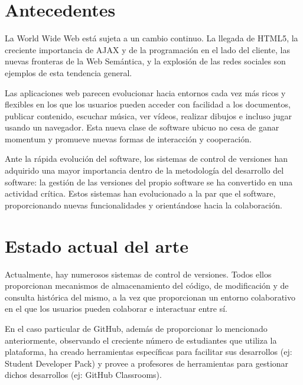 
\section{Antecedentes}
\label{1:sec:1}

La World Wide Web está sujeta a un cambio continuo. La llegada de HTML5, la creciente importancia
de AJAX y de la programación en el lado del cliente, las nuevas fronteras de la Web Semántica, y la
explosión de las redes sociales son ejemplos de esta tendencia general.
\bigskip

Las aplicaciones web parecen evolucionar hacia entornos cada vez más ricos y flexibles en los que
los usuarios pueden acceder con facilidad a los documentos, publicar contenido, escuchar música, ver
vídeos, realizar dibujos e incluso jugar usando un navegador. Esta nueva clase de software ubicuo no
cesa de ganar momentum y promueve nuevas formas de interacción y cooperación.
\bigskip

Ante la rápida evolución del software, los sistemas de control de versiones han adquirido una mayor importancia dentro de la metodología del desarrollo del software: la gestión de las versiones del propio software se ha convertido en una actividad crítica. Estos sistemas han evolucionado a la par que el software, proporcionando nuevas funcionalidades y orientándose hacia la colaboración.

\section{Estado actual del arte}
\label{1:sec:2}

Actualmente, hay numerosos sistemas de control de versiones. Todos ellos proporcionan mecanismos de almacenamiento del código, de modificación y de consulta histórica del mismo, a la vez que proporcionan un entorno colaborativo en el que los usuarios pueden colaborar e interactuar entre sí.

En el caso particular de GitHub, además de proporcionar lo mencionado anteriormente, observando el creciente número de estudiantes que utiliza la plataforma, ha creado herramientas específicas para facilitar sus desarrollos (ej: Student Developer Pack) y provee a profesores de herramientas para gestionar dichos desarrollos (ej: GitHub Classrooms).

